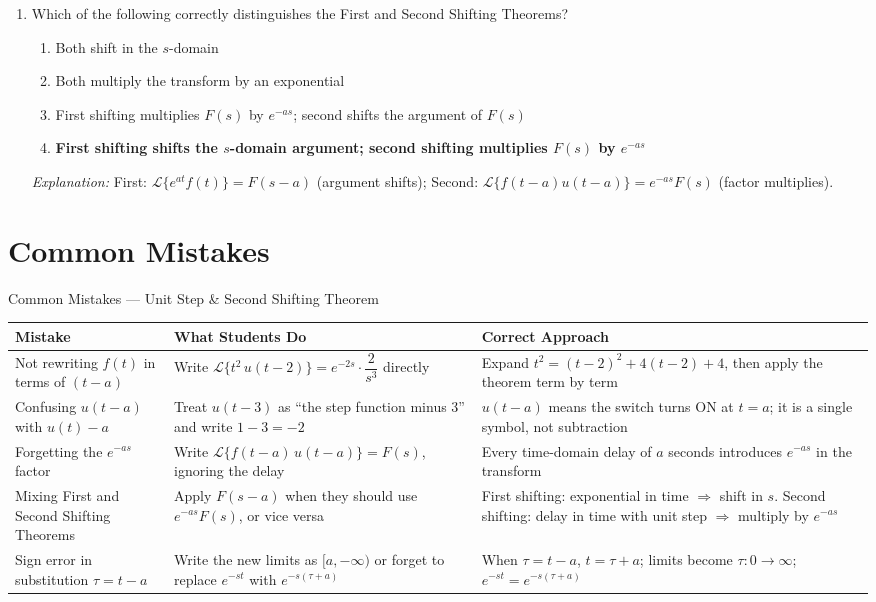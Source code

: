 \documentclass[12pt,a4paper]{article}
\begin{document}
\begin{enumerate}[label=\textbf{MCQ \arabic*.}]
\item Which of the following correctly distinguishes the First and Second Shifting Theorems?
  \begin{enumerate}[label=(\alph*)]
    \item Both shift in the $s$-domain
    \item Both multiply the transform by an exponential
    \item First shifting multiplies $F(s)$ by $e^{-as}$; second shifts the argument of $F(s)$
    \item \textbf{First shifting shifts the $s$-domain argument; second shifting multiplies $F(s)$ by $e^{-as}$}
  \end{enumerate}
  \textit{Explanation:} First: $\mathcal{L}\{e^{at}f(t)\}=F(s-a)$ (argument shifts); Second: $\mathcal{L}\{f(t-a)u(t-a)\}=e^{-as}F(s)$ (factor multiplies).

\end{enumerate}

\section{Common Mistakes}

\begin{mistakebox}{Common Mistakes --- Unit Step \& Second Shifting Theorem}
\begin{tabular}{@{}p{4.5cm}p{4.5cm}p{5cm}@{}}
\toprule
\textbf{Mistake} & \textbf{What Students Do} & \textbf{Correct Approach} \\
\midrule
Not rewriting $f(t)$ in terms of $(t-a)$
  & Write $\mathcal{L}\{t^2\,u(t-2)\} = e^{-2s}\cdot\dfrac{2}{s^3}$ directly
  & Expand $t^2 = (t-2)^2 + 4(t-2)+4$, then apply the theorem term by term \\
\addlinespace
Confusing $u(t-a)$ with $u(t) - a$
  & Treat $u(t-3)$ as ``the step function minus 3'' and write $1-3 = -2$
  & $u(t-a)$ means the switch turns ON at $t=a$; it is a single symbol, not subtraction \\
\addlinespace
Forgetting the $e^{-as}$ factor
  & Write $\mathcal{L}\{f(t-a)\,u(t-a)\} = F(s)$, ignoring the delay
  & Every time-domain delay of $a$ seconds introduces $e^{-as}$ in the transform \\
\addlinespace
Mixing First and Second Shifting Theorems
  & Apply $F(s-a)$ when they should use $e^{-as}F(s)$, or vice versa
  & First shifting: exponential in time $\Rightarrow$ shift in $s$.
    Second shifting: delay in time with unit step $\Rightarrow$ multiply by $e^{-as}$ \\
\addlinespace
Sign error in substitution $\tau = t - a$
  & Write the new limits as $[a, -\infty)$ or forget to replace $e^{-st}$ with $e^{-s(\tau+a)}$
  & When $\tau = t-a$, $t = \tau+a$; limits become $\tau: 0 \to \infty$; $e^{-st} = e^{-s(\tau+a)}$ \\
\bottomrule
\end{tabular}
\end{mistakebox}
\end{document}
